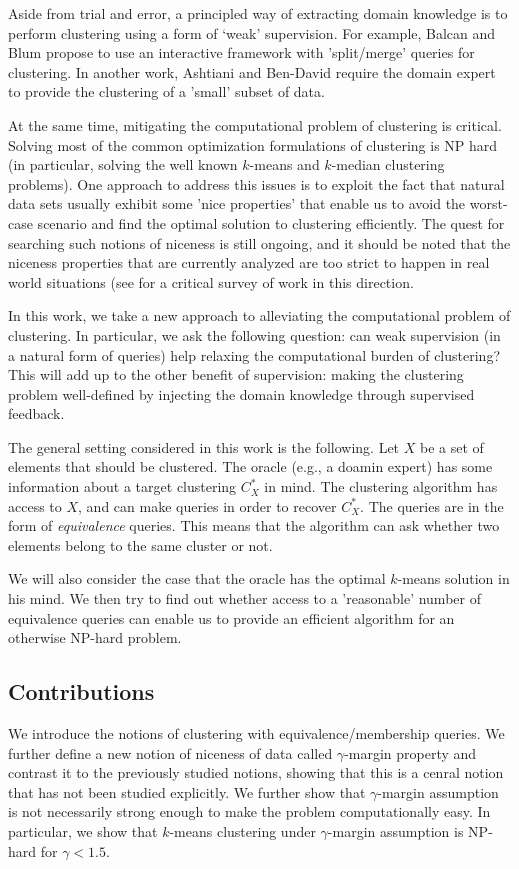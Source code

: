 \documentclass[orivec]{llncs}
\begin{document}
Aside from trial and error, a principled way of extracting domain knowledge is to perform clustering using a form of `weak' supervision.  For example, Balcan and Blum \cite{balcan2008clustering} propose to use an interactive framework with 'split/merge' queries for clustering. In another work, Ashtiani and Ben-David \cite{ashtiani2015representation} require the domain expert to provide the clustering of a 'small' subset of data.

At the same time, mitigating the computational problem of clustering is critical. Solving most of the common optimization formulations of clustering is NP hard (in particular, solving the well known $k$-means and $k$-median clustering problems). One approach to address this issues is to exploit the fact that natural data sets usually exhibit some 'nice properties' that enable us to avoid the worst-case scenario and find the optimal solution to clustering efficiently. The quest for searching such notions of niceness is still ongoing, and it should be noted that the niceness properties that are currently analyzed are too strict to happen in real world situations (see \cite{Ben-David15} for a critical survey of work in this direction.

In this work, we take a new approach to alleviating the computational problem of clustering. In particular, we ask the following question: can weak supervision (in a natural form of queries) help relaxing the computational burden of clustering? This will add up to the other benefit of supervision: making the clustering problem well-defined by injecting the domain knowledge through supervised feedback.

The general setting considered in this work is the following. Let $X$ be a set of elements that should be clustered. The oracle (e.g., a doamin expert) has some information about a  target clustering $C^*_X$ in mind. The clustering algorithm has access to $X$, and can make queries in order to recover $C^*_X$. The queries are in the form of \emph{equivalence} queries. This means that the algorithm can ask whether two elements belong to the same cluster or not.

We will also consider the case that the oracle has the optimal $k$-means solution in his mind. We then try to find out whether access to a 'reasonable' number of equivalence queries can enable us to provide an efficient algorithm for an otherwise NP-hard problem. 


\subsection{Contributions}
We introduce the notions of clustering with equivalence/membership queries. We further define a new notion of niceness of data called $\gamma$-margin property and contrast it to the previously studied notions, showing that this is a cenral notion that has not been studied explicitly. We further show that $\gamma$-margin assumption is not necessarily strong enough to make the problem computationally easy. In particular, we show that $k$-means clustering under $\gamma$-margin assumption is NP-hard for $\gamma < 1.5$.
\end{document}
